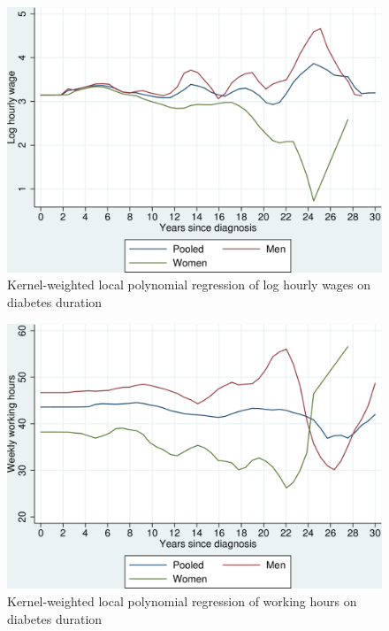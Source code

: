 \documentclass[12pt,english,british]{article}
\begin{document}
\begin{figure}[h!]
\caption{\label{fig:Kernel-weighted-local-polynomial_wage}Kernel-weighted local
polynomial regression of log hourly wages on diabetes duration}%
\begin{center}
\includegraphics[width=0.7\columnwidth]{figures/lpoly_wage_diabetesduration/lpoly_wage_diabetesduration}
\end{center}
\end{figure}

\begin{figure}[h!]
\caption{\label{fig:Kernel-weighted-local-polynomial_workhrs}Kernel-weighted local
polynomial regression of working hours on diabetes duration}%
\begin{center}
\includegraphics[width=0.7\columnwidth]{figures/lpoly_workhrs_diabetesduration/lpoly_workhrs_diabetesduration}
\end{center}
\end{figure}

\FloatBarrier
\end{document}
